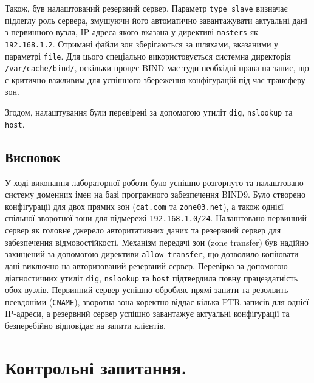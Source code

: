\documentclass[14pt, a4paper]{extreport}
\begin{document}
	Також, був налаштований резервний сервер. Параметр \texttt{type slave} визначає підлеглу роль сервера, змушуючи його автоматично завантажувати актуальні дані з первинного вузла, IP-адреса якого вказана у директиві \texttt{masters} як \texttt{192.168.1.2}. Отримані файли зон зберігаються за шляхами, вказаними у параметрі \texttt{file}. Для цього спеціально використовується системна директорія \texttt{/var/cache/bind/}, оскільки процес BIND має туди необхідні права на запис, що є критично важливим для успішного збереження конфігурацій під час трансферу зон.
	
	
	Згодом, налаштування були перевірені за допомогою утиліт \texttt{dig}, \texttt{nslookup} та \texttt{host}.
	
	
	\subsection*{Висновок}
	
	У ході виконання лабораторної роботи було успішно розгорнуто та налаштовано систему доменних імен на базі програмного забезпечення BIND9. Було створено конфігурації для двох прямих зон (\texttt{cat.com} та \texttt{zone03.net}), а також однієї спільної зворотної зони для підмережі \texttt{192.168.1.0/24}. Налаштовано первинний сервер як головне джерело авторитативних даних та резервний сервер для забезпечення відмовостійкості. Механізм передачі зон (zone transfer) був надійно захищений за допомогою директиви \texttt{allow-transfer}, що дозволило копіювати дані виключно на авторизований резервний сервер. Перевірка за допомогою діагностичних утиліт \texttt{dig}, \texttt{nslookup} та \texttt{host} підтвердила повну працездатність обох вузлів. Первинний сервер успішно обробляє прямі запити та резолвить псевдоніми (\texttt{CNAME}), зворотна зона коректно віддає кілька PTR-записів для однієї IP-адреси, а резервний сервер успішно завантажує актуальні конфігурації та безперебійно відповідає на запити клієнтів.
	
	\section*{Контрольні запитання.}
	
\end{document}
